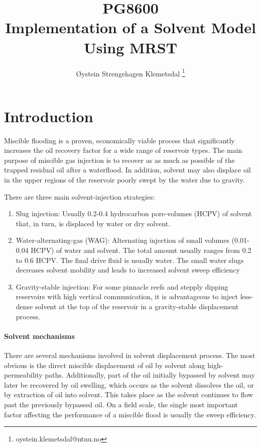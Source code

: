 \documentclass[11pt, a4paper]{article}
\title{\bfseries \textcolor{ntnuBlue}{PG8600 \\ \vspace{5pt} \Huge{Implementation of a Solvent Model Using MRST}}}
\author{Øystein Strengehagen Klemetsdal
  \thanks{oystein.klemetsdal@ntnu.no}}
\begin{document}
\maketitle

\begin{abstract}

\end{abstract}

\section{Introduction}

Miscible flooding is a proven, economically viable process that significantly
increases the oil recovery factor for a wide range of reservoir types. The main
purpose of miscible gas injection is to recover as as much as possible of the
trapped residual oil after a waterflood. In addition, solvent may also displace
oil in the upper regions of the reservoir poorly swept by the water due to
gravity.

There are three main solvent-injection strategies:
\begin{enumerate}[label=\emph{(\roman*)}]
\item Slug injection: Usually 0.2-0.4 hydrocarbon pore-volumes (HCPV) of solvent
  that, in turn, is displaced by water or dry solvent.
\item Water-alternating-gas (WAG): Alternating injection of small volumes
  (0.01-0.04 HCPV) of water and solvent. The total amount usually ranges from
  0.2 to 0.6 HCPV. The final drive fluid is usually water. The small water slugs
  decreases solvent mobility and leads to increased solvent sweep efficiency
\item Gravity-stable injection: For some pinnacle reefs and stepply dipping
  reservoirs with high vertical communication, it is advantageous to inject
  less-dense solvent at the top of the reservoir in a gravity-stable
  displacement process.
\end{enumerate}

\paragraph{Solvent mechanisms}

There are several mechanisms involved in solvent displacement process. The most
obvious is the direct miscible displacement of oil by solvent along
high-permeability paths. Additionally, part of the oil initially bypassed by
solvent may later be recovered by oil swelling, which occurs as the solvent
dissolves the oil, or by extraction of oil into solvent. This takes place as the
solvent continues to flow past the previously bypassed oil. On a field scale,
the single most important factor affecting the performance of a miscible flood
is usually the sweep efficiency.
\end{document}
